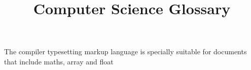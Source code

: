 \documentclass{article}
\title{Computer Science Glossary}
\author{ }
\date{ }
\begin{document}
\maketitle
 
The \Gls{compiler} typesetting markup language is specially suitable for documents that include \Gls{maths}, \Gls{array} and \Gls{float} 
 
\clearpage
 
\printglossaries
 
\end{document}
